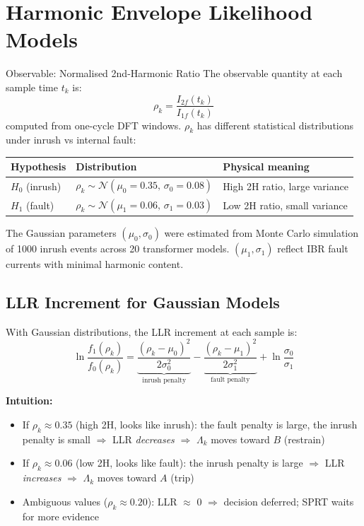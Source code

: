 \documentclass[12pt,a4paper]{article}
\begin{document}
\section{Harmonic Envelope Likelihood Models}

\begin{archbox}{Observable: Normalised 2nd-Harmonic Ratio}
The observable quantity at each sample time $t_k$ is:
\[
  \rho_k = \frac{I_{2f}(t_k)}{I_{1f}(t_k)}
\]
computed from one-cycle DFT windows. $\rho_k$ has different statistical distributions under inrush vs internal fault:

\medskip
\begin{center}
\begin{tabular}{@{}lll@{}}
\toprule
\textbf{Hypothesis} & \textbf{Distribution} & \textbf{Physical meaning} \\
\midrule
$H_0$ (inrush) & $\rho_k \sim \mathcal{N}(\mu_0=0.35,\, \sigma_0=0.08)$ & High 2H ratio, large variance \\
$H_1$ (fault)  & $\rho_k \sim \mathcal{N}(\mu_1=0.06,\, \sigma_1=0.03)$ & Low 2H ratio, small variance \\
\bottomrule
\end{tabular}
\end{center}

\medskip
The Gaussian parameters $(\mu_0, \sigma_0)$ were estimated from Monte Carlo simulation of 1000 inrush events across 20 transformer models. $(\mu_1, \sigma_1)$ reflect IBR fault currents with minimal harmonic content.
\end{archbox}

\subsection{LLR Increment for Gaussian Models}

With Gaussian distributions, the LLR increment at each sample is:
\begin{equation*}
  \ln\frac{f_1(\rho_k)}{f_0(\rho_k)} =
  \underbrace{\frac{(\rho_k - \mu_0)^2}{2\sigma_0^2}}_{\text{inrush penalty}}
  - \underbrace{\frac{(\rho_k - \mu_1)^2}{2\sigma_1^2}}_{\text{fault penalty}}
  + \ln\frac{\sigma_0}{\sigma_1}
\end{equation*}

\textbf{Intuition:}
\begin{itemize}[nosep]
  \item If $\rho_k \approx 0.35$ (high 2H, looks like inrush): the fault penalty is large, the inrush penalty is small $\Rightarrow$ LLR \textit{decreases} $\Rightarrow$ $\Lambda_k$ moves toward $B$ (restrain)
  \item If $\rho_k \approx 0.06$ (low 2H, looks like fault): the inrush penalty is large $\Rightarrow$ LLR \textit{increases} $\Rightarrow$ $\Lambda_k$ moves toward $A$ (trip)
  \item Ambiguous values ($\rho_k \approx 0.20$): LLR $\approx$  0 $\Rightarrow$ decision deferred; SPRT waits for more evidence
\end{itemize}
\end{document}

